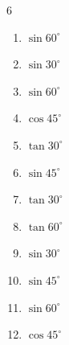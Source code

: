\begin{multicols}{6}
\begin{enumerate}

  \item $\displaystyle \sin{60^\circ}$


  \item $\displaystyle \sin{30^\circ}$


  \item $\displaystyle \sin{60^\circ}$


  \item $\displaystyle \cos{45^\circ}$


  \item $\displaystyle \tan{30^\circ}$


  \item $\displaystyle \sin{45^\circ}$


  \item $\displaystyle \tan{30^\circ}$


  \item $\displaystyle \tan{60^\circ}$


  \item $\displaystyle \sin{30^\circ}$


  \item $\displaystyle \sin{45^\circ}$


  \item $\displaystyle \sin{60^\circ}$


\columnbreak %

  \item $\displaystyle \cos{45^\circ}$


\end{enumerate}
\end{multicols}
